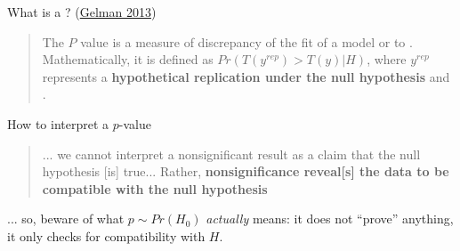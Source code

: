 \documentclass[t]{beamer}
\begin{document}
  \begin{frame}[t]{What is a ? (\href{http://www.stat.columbia.edu/~gelman/research/published/pvalues3.pdf}{Gelman 2013})}
    
    \begin{quote}
      The $P$ value is a measure of discrepancy of the fit of a model or  to .\\[1em]%
      Mathematically, it is defined as $Pr(T(y^{rep})>T(y)|H)$, where $y^{rep}$ represents a \textbf{hypothetical replication under the null hypothesis} and .%
    \end{quote}

    \begin{alertblock}{How to interpret a $p$-value}
      \begin{quote}
        ... we cannot interpret a nonsignificant result as a claim that the null hypothesis [is] true... Rather, \textbf{nonsignificance reveal[s] the data to be compatible with the null hypothesis}
      \end{quote}
      ... so, beware of what $p \sim Pr(H_0)$ \emph{actually} means: it does not ``prove'' anything, it only checks for compatibility with $H$.
    \end{alertblock}
    
  \end{frame}

  
\end{document}
